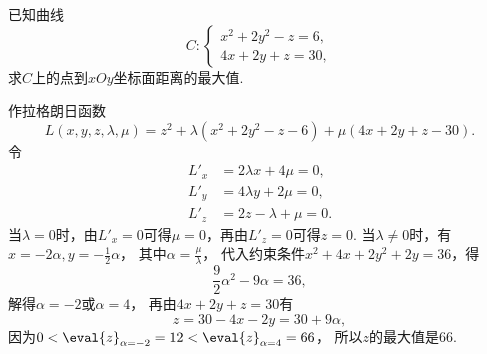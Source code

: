 \begin{example}
已知曲线\begin{equation*}
	C: \left\{ \begin{array}{l}
		x^2+2y^2-z=6, \\
		4x+2y+z=30,
	\end{array} \right.
\end{equation*}
求\(C\)上的点到\(xOy\)坐标面距离的最大值.
\begin{solution}
作拉格朗日函数\begin{equation*}
	L(x,y,z,\lambda,\mu)
	= z^2 + \lambda(x^2+2y^2-z-6) + \mu(4x+2y+z-30).
\end{equation*}
令\begin{align*}
	L'_x &= 2\lambda x + 4\mu = 0, \\
	L'_y &= 4\lambda y + 2\mu = 0, \\
	L'_z &= 2z - \lambda + \mu = 0.
\end{align*}
当\(\lambda=0\)时，由\(L'_x = 0\)可得\(\mu=0\)，再由\(L'_z=0\)可得\(z=0\).
当\(\lambda\neq0\)时，有\(x = -2 \alpha,
y = -\frac12 \alpha\)，
其中\(\alpha = \frac\mu\lambda\)，
代入约束条件\(x^2 + 4x + 2y^2 + 2y = 36\)，得\begin{equation*}
	\frac92\alpha^2 - 9\alpha = 36,
\end{equation*}
解得\(\alpha=-2\)或\(\alpha=4\)，
再由\(4x+2y+z=30\)有\begin{equation*}
	z = 30 - 4x - 2y
	= 30 + 9\alpha,
\end{equation*}
因为\(0 < \eval{z}_{\alpha=-2} = 12 < \eval{z}_{\alpha=4} = 66\)，
所以\(z\)的最大值是\(66\).
\end{solution}
\end{example}
